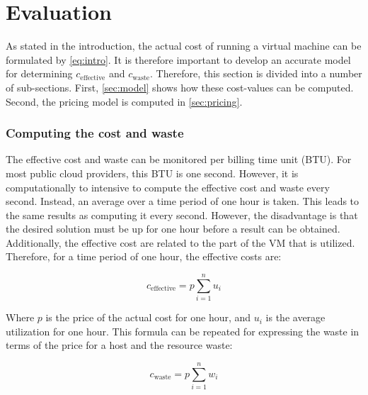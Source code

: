 \chapter{Evaluation}\label{ch:evaluation}

As stated in the introduction, the actual cost of running a virtual machine can be formulated by \autoref{eq:intro}. It is therefore important to develop an accurate model for determining $c_\text{effective}$ and $c_\text{waste}$. Therefore, this section is divided into a number of sub-sections. First, \autoref{sec:model} shows how these cost-values can be computed. Second, the pricing model is computed in \autoref{sec:pricing}.

%
\subsection{Computing the cost and waste} \label{sec:model}
The effective cost and waste can be monitored per billing time unit (BTU). For most public cloud providers, this BTU is one second. However, it is computationally to intensive to compute the effective cost and waste every second. Instead, an average over a time period of one hour is taken. This leads to the same results as computing it every second. However, the disadvantage is that the desired solution must be up for one hour before a result can be obtained. Additionally, the effective cost are related to the part of the VM that is utilized. Therefore, for a time period of one hour, the effective costs are:

\begin{equation} \label{eq:effective}
c_\text{effective} = p \sum_{i=1}^n u_i
\end{equation}

\noindent
Where $p$ is the price of the actual cost for one hour, and $u_i$ is the average utilization for one hour. This formula can be repeated for expressing the waste in terms of the price for a host and the resource waste:

\begin{equation} \label{eq:waste}
c_\text{waste} = p \sum_{i=1}^n w_i
\end{equation}


